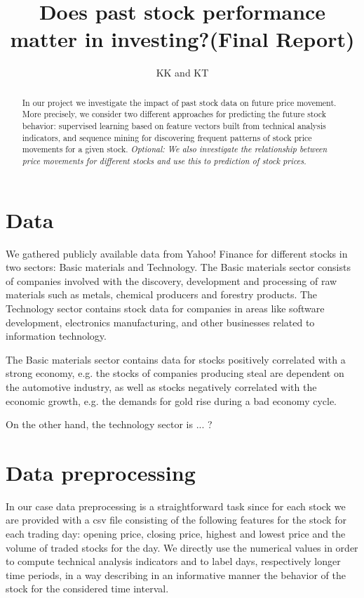 \documentclass{llncs}
\begin{document}
\title{Does past stock performance matter in investing?(Final Report)}
\date{}
\author{KK and KT}
\institute{}
\maketitle
\begin{abstract}
In our project we investigate the impact of past stock data on future price movement. More precisely, we consider two different approaches for predicting the future stock behavior: supervised learning based on feature vectors built from technical analysis indicators, and  sequence mining for discovering frequent patterns of stock price movements for a given stock. {\em Optional: We also investigate the relationship between price movements for different stocks and use this to prediction of stock prices.}
\end{abstract}
\section*{Data}
We gathered publicly available data from Yahoo! Finance for different stocks in two sectors: Basic materials and Technology. The Basic materials sector consists of companies involved with the discovery, development and processing of raw materials such as metals, chemical producers and forestry products. The Technology sector contains stock data for companies in areas like software development, electronics manufacturing, and other businesses related to information technology.

The Basic materials sector contains data for stocks positively correlated with a strong economy, e.g. the stocks of companies producing steal are dependent on the automotive industry, as well as stocks negatively correlated with the economic growth, e.g. the demands for gold rise during a bad economy cycle.

On the other hand, the technology sector is ... ?
\section*{Data preprocessing}
In our case data preprocessing is a straightforward task since for each stock we are provided with a csv file consisting of the following features for the stock for each trading day: opening price, closing price, highest and lowest price and the volume of traded stocks for the day. We directly use the numerical values in order to compute technical analysis indicators and to label days, respectively longer time periods, in a way describing in an informative manner the behavior of the stock for the considered time interval. 
\end{document}
